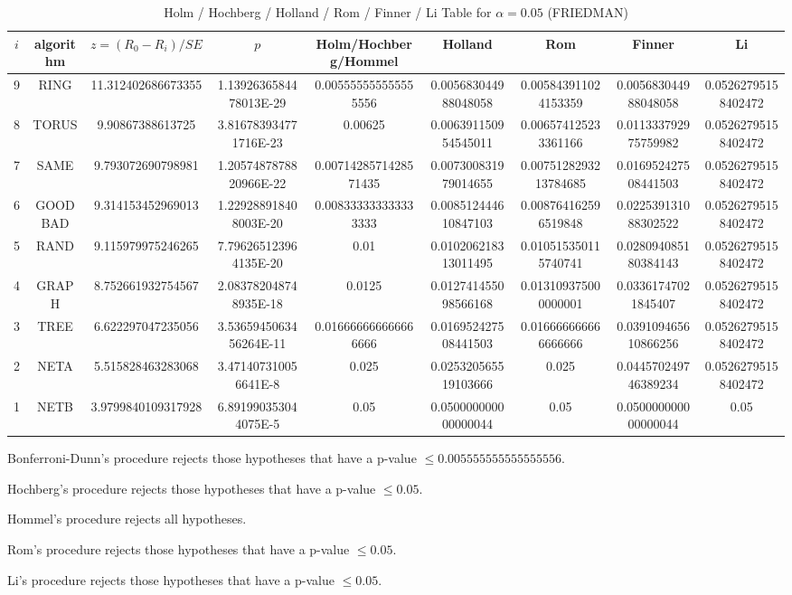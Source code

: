 \documentclass[a4paper,10pt]{article}
\begin{document}
\begin{landscape}
\begin{table}[!htp]
\centering\scriptsize
\caption{Holm / Hochberg / Holland / Rom / Finner / Li Table for $\alpha=0.05$ (FRIEDMAN)}
\begin{tabular}{ccccccccc}
$i$&algorithm&$z=(R_0 - R_i)/SE$&$p$&Holm/Hochberg/Hommel&Holland&Rom&Finner&Li\\
\hline
9& RING&11.312402686673355&1.1392636584478013E-29&0.005555555555555556&0.005683044988048058&0.005843911024153359&0.005683044988048058&0.05262795158402472\\
8& TORUS&9.90867388613725&3.816783934771716E-23&0.00625&0.006391150954545011&0.006574125233361166&0.011333792975759982&0.05262795158402472\\
7& SAME&9.793072690798981&1.2057487878820966E-22&0.0071428571428571435&0.007300831979014655&0.0075128293213784685&0.016952427508441503&0.05262795158402472\\
6& GOODBAD&9.314153452969013&1.229288918408003E-20&0.008333333333333333&0.008512444610847103&0.008764162596519848&0.022539131088302522&0.05262795158402472\\
5& RAND&9.115979975246265&7.796265123964135E-20&0.01&0.010206218313011495&0.010515350115740741&0.028094085180384143&0.05262795158402472\\
4& GRAPH&8.752661932754567&2.083782048748935E-18&0.0125&0.012741455098566168&0.013109375000000001&0.03361747021845407&0.05262795158402472\\
3& TREE&6.622297047235056&3.5365945063456264E-11&0.016666666666666666&0.016952427508441503&0.016666666666666666&0.039109465610866256&0.05262795158402472\\
2& NETA&5.515828463283068&3.471407310056641E-8&0.025&0.025320565519103666&0.025&0.044570249746389234&0.05262795158402472\\
1& NETB&3.9799840109317928&6.891990353044075E-5&0.05&0.050000000000000044&0.05&0.050000000000000044&0.05\\
\hline
\end{tabular}
\end{table}
Bonferroni-Dunn's procedure rejects those hypotheses that have a p-value $\le0.005555555555555556$.


Hochberg's procedure rejects those hypotheses that have a p-value $\le0.05$.


Hommel's procedure rejects all hypotheses.


Rom's procedure rejects those hypotheses that have a p-value $\le0.05$.


Li's procedure rejects those hypotheses that have a p-value $\le0.05$.




\end{landscape}
\end{document}
